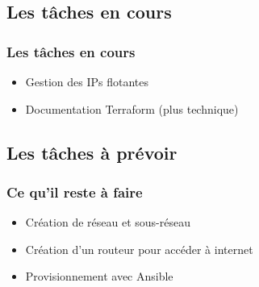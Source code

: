 \documentclass[11pt]{beamer} %
\begin{document}
		
		\subsection{Les tâches en cours}
			\begin{frame}
				\frametitle{Les tâches en cours}
				\begin{itemize}
					\item Gestion des IPs flotantes
					\item Documentation Terraform (plus technique)
				\end{itemize}
			\end{frame}
		
			
		
		\subsection{Les tâches à prévoir}
			\begin{frame}
				\frametitle{Ce qu'il reste à faire}
				\begin{itemize}
					\item Création de réseau et sous-réseau
					\item Création d'un routeur pour accéder à internet
					\item Provisionnement avec Ansible
				\end{itemize}
			\end{frame}
		
\end{document}
